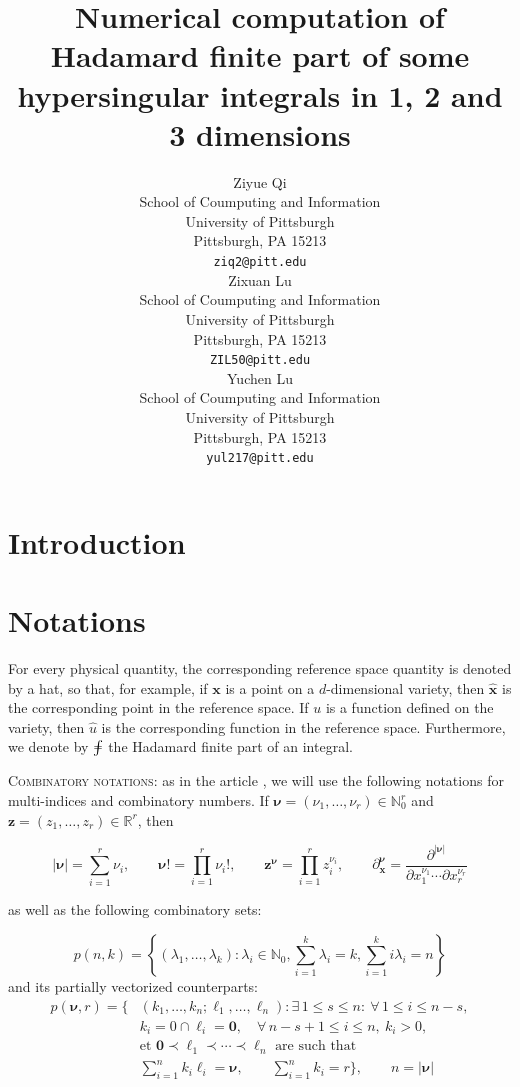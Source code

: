 ﻿\documentclass{article}
\title{Numerical computation of Hadamard finite part of some hypersingular integrals in 1, 2 and 3 dimensions}
\author{
 Ziyue Qi \\
  School of Coumputing and Information\\
  University of Pittsburgh\\
  Pittsburgh, PA 15213 \\
  \texttt{ziq2@pitt.edu} \\
   \And
 Zixuan Lu \\
  School of Coumputing and Information\\
  University of Pittsburgh\\
  Pittsburgh, PA 15213 \\
  \texttt{ZIL50@pitt.edu} \\
  \And
 Yuchen Lu \\
  School of Coumputing and Information\\
  University of Pittsburgh\\
  Pittsburgh, PA 15213 \\
  \texttt{yul217@pitt.edu} \\
}
\begin{document}


\maketitle
\begin{abstract}

\end{abstract}



\section{Introduction}

\section{Notations}
For every physical quantity, the corresponding reference space quantity is denoted by a hat, so that, for example, if $\mathbf x$ is a point on a $d$-dimensional variety, then $\hat{\mathbf x}$ is the corresponding point in the reference space. If $u$ is a function defined on the variety, then $\hat{u}$ is the corresponding function in the reference space. Furthermore, we denote by $\ddashint$ the Hadamard finite part of an integral.

\textsc{Combinatory notations}: as in the article \cite{constantine_multivariate_1996}, we will use the following notations for multi-indices and combinatory numbers. If $\bm\nu = (\nu_1, \dots, \nu_r) \in \mathbb N_0^r$ and $\bm z = (z_1, \dots, z_r) \in \mathbb R^r$, then

\begin{equation}
  |\bm\nu| = \sum_{i=1}^{r}\nu_i, \qquad \bm\nu! = \prod_{i=1}^{r}\nu_i!, \qquad \bm z^{\bm\nu} = \prod_{i=1}^{r}z_i^{\nu_i}, \qquad \partial^{\bm\nu}_{\bm x} = \frac{\partial^{|\bm\nu|}}{\partial x_1^{\nu_1}\cdots \partial x_r^{\nu_r}}
\end{equation}

as well as the following combinatory sets:

\begin{equation}
  p(n, k) = \left\{(\lambda_1, \dots, \lambda_k):\lambda_i\in\mathbb N_0, \sum_{i=1}^{k} \lambda_i = k, \sum_{i=1}^{k} i\lambda_i = n\right\}
\end{equation}
and its partially vectorized counterparts:
\begin{equation}
\begin{aligned}
p(\bm\nu,r) = \Big\{&(k_1,\dots,k_n;\bm\ell_1,\dots,\bm\ell_n): 
\exists\,1\leq s\leq n:\ \forall\,1\leq i\leq n-s,\\
&k_i=0 \cap \bm\ell_i=\bm 0,\quad 
\forall\,n-s+1\leq i\leq n,\ k_i>0,\\
&\text{et } \bm 0\prec\bm\ell_1\prec\cdots\prec\bm\ell_n
\text{ are such that }\\
&\sum_{i=1}^{n}k_i\bm\ell_i=\bm\nu,\qquad
\sum_{i=1}^{n}k_i=r\Big\}, \qquad n = |\bm\nu|
\end{aligned}
\end{equation}
\end{document}
